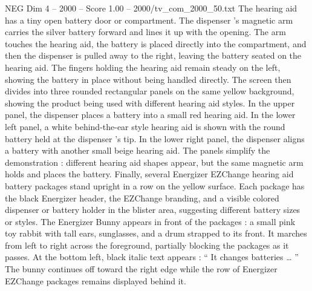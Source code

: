 \begin{textsample}{NEG Dim 4 – 2000 – Score 1.00 – 2000/tv\_com\_2000\_50.txt}
The hearing aid has a tiny open battery door or compartment.
The dispenser ’s magnetic arm carries the silver battery forward and lines it up with the opening.
The arm touches the hearing aid, the battery is placed directly into the compartment, and then the dispenser is pulled away to the right, leaving the battery seated on the hearing aid.
The fingers holding the hearing aid remain steady on the left, showing the battery in place without being handled directly.
The screen then divides into three rounded rectangular panels on the same yellow background, showing the product being used with different hearing aid styles.
In the upper panel, the dispenser places a battery into a small red hearing aid.
In the lower left panel, a white behind-the-ear style hearing aid is shown with the round battery held at the dispenser ’s tip.
In the lower right panel, the dispenser aligns a battery with another small beige hearing aid.
The panels simplify the demonstration : different hearing aid shapes appear, but the same magnetic arm holds and places the battery.
Finally, several Energizer EZChange hearing aid battery packages stand upright in a row on the yellow surface.
Each package has the black Energizer header, the EZChange branding, and a visible colored dispenser or battery holder in the blister area, suggesting different battery sizes or styles.
The Energizer Bunny appears in front of the packages : a small pink toy rabbit with tall ears, sunglasses, and a drum strapped to its front.
It marches from left to right across the foreground, partially blocking the packages as it passes.
At the bottom left, black italic text appears : “ It changes batteries … ” The bunny continues off toward the right edge while the row of Energizer EZChange packages remains displayed behind it.

\end{textsample}
